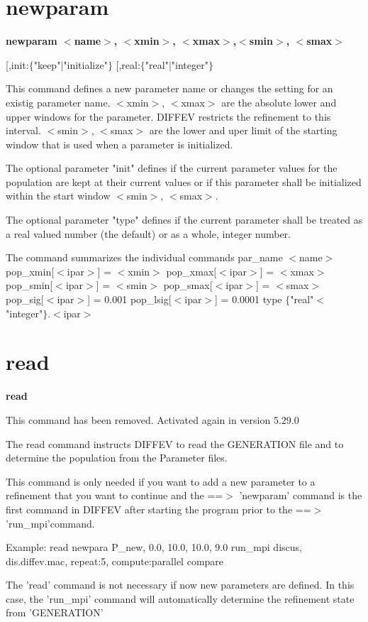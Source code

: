 \section{newparam}
{\bf newparam $ <$name$> $, $ <$xmin$> $, $ <$xmax$> $,$ <$smin$> $, $ <$smax$> $ \par }
\vspace{3pt}
         [,init:$ \{$"keep"$| $"initialize"$\} $ 
         [,real:$ \{$"real"$| $"integer"$\} $ 
\par
This command defines a new parameter name or changes the setting for 
an existig parameter name. 
$ <$xmin$> $, $ <$xmax$> $ are the absolute lower and upper windows for the 
               parameter. DIFFEV restricts the refinement to this 
               interval. 
$ <$smin$> $, $ <$smax$> $ are the lower and uper limit of the starting 
               window that is used when a parameter is initialized. 
\par
The optional parameter "init" defines if the current parameter 
values for the population are kept at their current values or if 
this parameter shall be initialized within the start window 
$ <$smin$> $, $ <$smax$> $. 
\par
The optional parameter "type" defines if the current parameter 
shall be treated as a real valued number (the default) or as a 
whole, integer number. 
\par
The command summarizes the individual commands 
  par\_name $ <$name$> $ 
  pop\_xmin[$ <$ipar$> $] = $ <$xmin$> $ 
  pop\_xmax[$ <$ipar$> $] = $ <$xmax$> $ 
  pop\_smin[$ <$ipar$> $] = $ <$smin$> $ 
  pop\_smax[$ <$ipar$> $] = $ <$smax$> $ 
  pop\_sig[$ <$ipar$> $]  = 0.001 
  pop\_lsig[$ <$ipar$> $] = 0.0001 
  type $ \{$"real"$ <$"integer"$\} $.$ <$ipar$> $ 
\par
\section{read}
{\bf read \par }
\par
\vspace{3pt}
This command has been removed. 
Activated again in version 5.29.0 
\par
The read command instructs DIFFEV to read the GENERATION file 
and to determine the population from the Parameter files. 
\par
This command is only needed if you want to add a new parameter 
to a refinement that you want to continue and the ==$> $ 'newparam' 
command is the first command in DIFFEV after starting the 
program prior to the ==$> $ 'run\_mpi'command. 
\par
Example: 
read 
newpara  P\_new, 0.0, 10.0,  10.0, 9.0 
run\_mpi discus, dis.diffev.mac, repeat:5, compute:parallel 
compare 
\par
The 'read' command is not necessary if now new parameters 
are defined. In this case, the 'run\_mpi' command will 
automatically determine the refinement state from 'GENERATION' 
